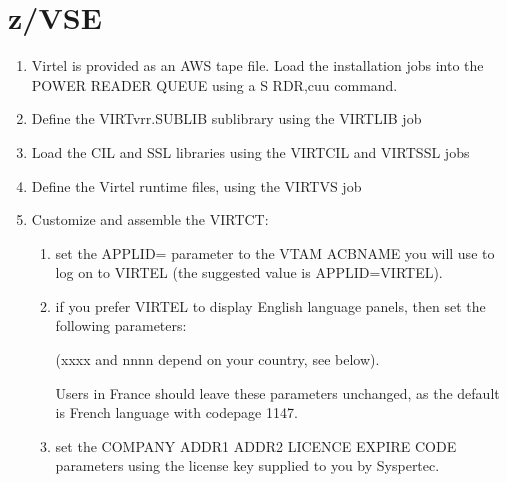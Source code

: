 \documentclass[letterpaper,10pt,english]{sphinxmanual}
\begin{document}
\section{z/VSE}
\label{\detokenize{Getting_Started:z-vse}}\begin{enumerate}
%
\item {} 
\sphinxAtStartPar
Virtel is provided as an AWS tape file. Load the installation jobs into the POWER READER QUEUE using a S RDR,cuu command.

\item {} 
\sphinxAtStartPar
Define the VIRTvrr.SUBLIB sublibrary using the VIRTLIB job

\item {} 
\sphinxAtStartPar
Load the CIL and SSL libraries using the VIRTCIL and VIRTSSL jobs

\item {} 
\sphinxAtStartPar
Define the Virtel runtime files, using the VIRTVS job

\item {} 
\sphinxAtStartPar
Customize and assemble the VIRTCT:
\begin{enumerate}
%
\item {} 
\sphinxAtStartPar
set the APPLID= parameter to the VTAM ACBNAME you will use to log on to VIRTEL (the suggested value is APPLID=VIRTEL).

\item {} 
\sphinxAtStartPar
if you prefer VIRTEL to display English language panels, then set the following parameters:

\begin{sphinxVerbatim}[commandchars=\\\{\}]
                                               
                                           
                                        
\end{sphinxVerbatim}

\sphinxAtStartPar
(xxxx and nnnn depend on your country, see below).

\sphinxAtStartPar
Users in France should leave these parameters unchanged, as the default is French language with codepage 1147.

\item {} 
\sphinxAtStartPar
set the COMPANY ADDR1 ADDR2 LICENCE EXPIRE CODE parameters using the license key supplied to you by Syspertec.


\end{enumerate}
\end{enumerate}
\end{document}
